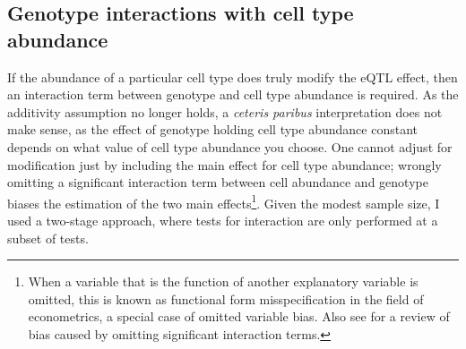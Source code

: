 \subsection{Genotype interactions with cell type abundance}
\label{subsec:hird_reQTL_methods_cellTypeInteraction}

%
If the abundance of a particular cell type does truly modify the \gls{eQTL} effect, 
then an interaction term between genotype and cell type abundance is required.
As the additivity assumption no longer holds, a \textit{ceteris paribus} interpretation does not make sense,
as the effect of genotype holding cell type abundance constant depends on what value of cell type abundance you choose.
One cannot adjust for modification just by including the main effect for cell type abundance;
wrongly omitting a significant interaction term between cell abundance and genotype biases the estimation of the two main effects\footnote{When a variable that is the function of another explanatory variable is omitted, this is known as functional form misspecification in the field of econometrics, a special case of omitted variable bias. Also see \textcite{mikucka2015CostsBenefitsIncluding} for a review of bias caused by omitting significant interaction terms.}.
Given the modest sample size, I used a two-stage approach,
where tests for interaction are only performed at a subset of tests.
%
